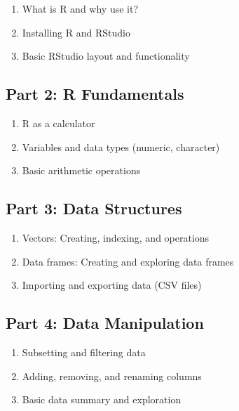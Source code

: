 \documentclass[
]{book}
\providecommand{\tightlist}{%
  \setlength{\itemsep}{0pt}\setlength{\parskip}{0pt}}
\begin{document}
\begin{enumerate}
\def\labelenumi{\arabic{enumi}.}
\tightlist
\item
  What is R and why use it?
\item
  Installing R and RStudio
\item
  Basic RStudio layout and functionality
\end{enumerate}

\subsection*{Part 2: R Fundamentals}\label{part-2-r-fundamentals}

\begin{enumerate}
\def\labelenumi{\arabic{enumi}.}
\tightlist
\item
  R as a calculator
\item
  Variables and data types (numeric, character)
\item
  Basic arithmetic operations
\end{enumerate}

\subsection*{Part 3: Data Structures}\label{part-3-data-structures}

\begin{enumerate}
\def\labelenumi{\arabic{enumi}.}
\tightlist
\item
  Vectors: Creating, indexing, and operations
\item
  Data frames: Creating and exploring data frames
\item
  Importing and exporting data (CSV files)
\end{enumerate}

\subsection*{Part 4: Data Manipulation}\label{part-4-data-manipulation}

\begin{enumerate}
\def\labelenumi{\arabic{enumi}.}
\tightlist
\item
  Subsetting and filtering data
\item
  Adding, removing, and renaming columns
\item
  Basic data summary and exploration
\end{enumerate}
\end{document}
